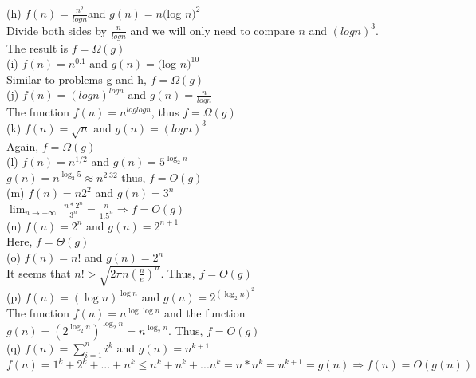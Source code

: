 \documentclass{article}
\begin{document}
\indent (h) $f(n) = \frac{n^2}{logn}$and $g(n) = n($log $n)^2$\\
\indent \indent Divide both sides by $\frac{n}{logn}$ and we will only need to compare $n$ and $(logn)^3$. \\
\indent \indent The result is $f = \Omega(g)$\\

\indent (i) $f(n) = n^0.1$ and $g(n) = ($log $n)^{10}$\\
\indent \indent Similar to problems g and h, $f = \Omega(g)$\\

\indent (j) $f(n) = (logn)^{logn}$ and $g(n) = \frac{n}{logn}$\\
\indent \indent The function $f(n) = n^{loglogn}$, thus $f = \Omega(g)$\\

\indent (k) $f(n) = \sqrt{n}$ and $g(n) = (logn)^3$\\
\indent \indent Again, $f = \Omega(g)$\\

\indent (l) $f(n) = n^{1/2}$ and $g(n) = 5^{\log_2 n}$\\
\indent \indent $g(n) = n^{\log_2 5} \approx  n^{2.32}$ thus, $f = O(g)$\\

\indent (m) $f(n) = n2^2$ and $g(n) = 3^n$\\
\indent \indent $\lim_{n \to +\infty}$ $\frac{n * 2^n}{3^n} = \frac{n}{1.5^n} \Rightarrow f = O(g)$\\

\indent (n) $f(n) = 2^n$ and $g(n) = 2^{n + 1}$\\
\indent \indent Here, $f = \Theta(g)$\\

\indent (o) $f(n) = n!$ and $g(n) = 2^n$\\
\indent \indent It seems that $n! > \sqrt{2\pi n(\frac{n}{e})^n}$. Thus, $f = O(g)$\\

\indent (p) $f(n) = (\log n)^{\log n}$ and $g(n) = 2^{({\log_2 n})^2}$\\
\indent \indent The function $f(n) = n^{\log \log n}$ and the function \\
\indent \indent $g(n) = (2^{\log_2 n})^{\log_2 n} = n^{\log_2 n}$. Thus, $f = O(g)$\\

\indent (q) $f(n) = \sum\limits_{i=1}^n i^k$ and $g(n) = n^{k + 1}$\\
$f(n) = 1^k + 2^k + . . . + n^k \le n^k + n^k + . . . n^k = n*n^k = n^{k + 1} = g(n) \Rightarrow f(n) = O(g(n))$\\
\end{document}
